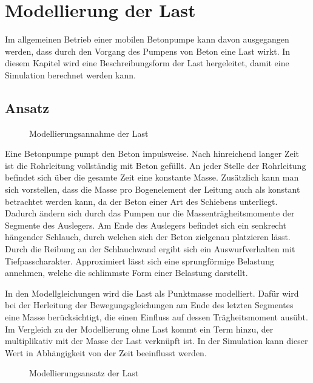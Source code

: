 \chapter{Modellierung der Last}

Im allgemeinen Betrieb einer mobilen Betonpumpe kann davon ausgegangen werden, dass durch den Vorgang des Pumpens von Beton eine Last wirkt. In diesem Kapitel wird eine Beschreibungsform der Last hergeleitet, damit eine Simulation berechnet werden kann.

\section{Ansatz}

\begin{figure}[h]
	\centering
	
	\caption[]{Modellierungsannahme der Last}
	\label{fig:Manipulator_Last}
\end{figure}

Eine Betonpumpe pumpt den Beton impulsweise. Nach hinreichend langer Zeit ist die Rohrleitung vollständig mit Beton gefüllt. An jeder Stelle der Rohrleitung befindet sich über die gesamte Zeit eine konstante Masse. Zusätzlich kann man sich vorstellen, dass die Masse pro Bogenelement der Leitung auch als konstant betrachtet werden kann, da der Beton einer Art des Schiebens unterliegt. Dadurch ändern sich durch das Pumpen nur die Massenträgheitsmomente der Segmente des Auslegers. Am Ende des Auslegers befindet sich ein senkrecht hängender Schlauch, durch welchen sich der Beton zielgenau platzieren lässt. Durch die Reibung an der Schlauchwand ergibt sich ein Auswurfverhalten mit Tiefpasscharakter. Approximiert lässt sich eine sprungförmige Belastung annehmen, welche die schlimmste Form einer Belastung darstellt. 

In den Modellgleichungen wird die Last als Punktmasse modelliert. Dafür wird bei der Herleitung der Bewegungsgleichungen am Ende des letzten Segmentes eine Masse berücksichtigt, die einen Einfluss auf dessen Trägheitsmoment ausübt. Im Vergleich zu der Modellierung ohne Last kommt ein Term hinzu, der multiplikativ mit der Masse der Last verknüpft ist. In der Simulation kann dieser Wert in Abhängigkeit von der Zeit beeinflusst werden.  

\begin{figure}[h]
	\centering
	
	\caption[]{Modellierungsansatz der Last}
	\label{fig:Manipulator_Last}
\end{figure} 
